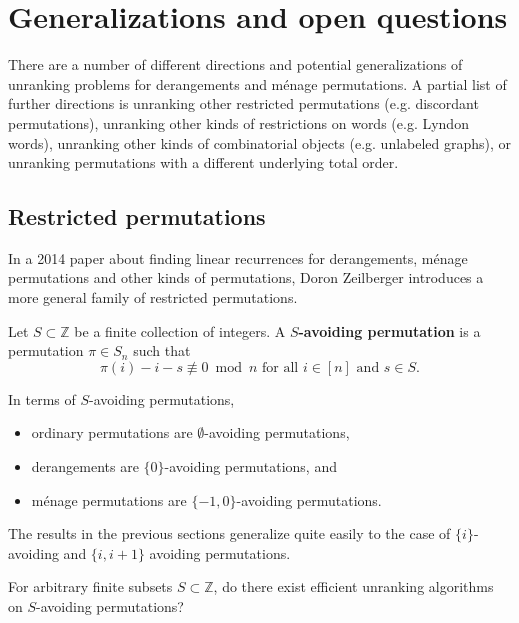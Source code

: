 

\section{Generalizations and open questions}

There are a number of different directions and potential generalizations of
unranking problems for derangements and m\'enage permutations.
A partial list of further directions is
unranking other restricted permutations
(e.g. discordant permutations),
unranking other kinds of restrictions on words
(e.g. Lyndon words),
unranking other kinds of combinatorial objects
(e.g. unlabeled graphs), or
unranking permutations with a different underlying total order.
%
\subsection{Restricted permutations}
In a 2014 paper about finding linear recurrences for derangements, m\'enage
permutations and other kinds of permutations, Doron Zeilberger
introduces a more general family of restricted permutations.
\begin{definition}
  Let $S \subset \mathbb Z$ be a finite collection of integers.
  A \textbf{$S$-avoiding permutation} is a permutation $\pi \in S_n$ such that
  \[
    \pi(i) - i - s \not\equiv 0 \bmod n \text{ for all } i \in [n] \text{ and } s \in S.
  \]
\end{definition}

\begin{example}
  In terms of $S$-avoiding permutations, \begin{itemize}
    \item ordinary permutations are $\emptyset$-avoiding permutations,
    \item derangements are $\{0\}$-avoiding permutations, and
    \item m\'enage permutations are $\{-1,0\}$-avoiding permutations.
  \end{itemize}
\end{example}

The results in the previous sections generalize quite easily to the case of
$\{i\}$-avoiding and $\{i, i+1\}$ avoiding permutations.

\begin{openquestion}
  For arbitrary finite subsets $S \subset \mathbb Z$,
  do there exist efficient unranking algorithms on $S$-avoiding permutations?
\end{openquestion}

